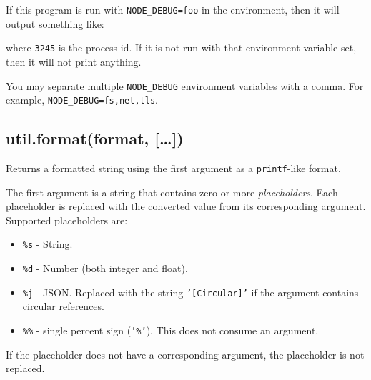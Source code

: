 If this program is run with \texttt{NODE\_DEBUG=foo} in the environment,
then it will output something like:

\begin{Shaded}
\begin{Highlighting}[]
\NormalTok{: hello from foo [}\NormalTok{]}
\end{Highlighting}
\end{Shaded}

where \texttt{3245} is the process id. If it is not run with that
environment variable set, then it will not print anything.

You may separate multiple \texttt{NODE\_DEBUG} environment variables
with a comma. For example, \texttt{NODE\_DEBUG=fs,net,tls}.

\subsection{util.format(format, {[}\ldots{}{]})}

Returns a formatted string using the first argument as a
\texttt{printf}-like format.

The first argument is a string that contains zero or more
\emph{placeholders}. Each placeholder is replaced with the converted
value from its corresponding argument. Supported placeholders are:

\begin{itemize}
\item
  \texttt{\%s} - String.
\item
  \texttt{\%d} - Number (both integer and float).
\item
  \texttt{\%j} - JSON. Replaced with the string
  \texttt{'{[}Circular{]}'} if the argument contains circular
  references.
\item
  \texttt{\%\%} - single percent sign (\texttt{'\%'}). This does not
  consume an argument.
\end{itemize}

If the placeholder does not have a corresponding argument, the
placeholder is not replaced.

\begin{Shaded}
\end{Shaded}

